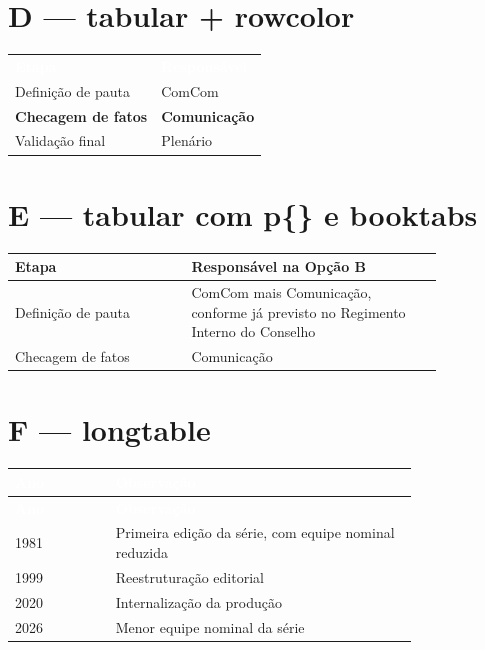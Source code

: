 \documentclass[11pt]{article}
\begin{document}
\section*{D --- tabular + rowcolor}

\begin{tabular}{ll}
  \rowcolor{herhighness}
  \textcolor{white}{\textbf{Etapa}} & \textcolor{white}{\textbf{Responsável}} \\
  Definição de pauta & ComCom \\
  \rowcolor{alarmefundo}
  \textbf{Checagem de fatos} & \textbf{Comunicação} \\
  Validação final & Plenário \\
\end{tabular}

\section*{E --- tabular com p\{\} e booktabs}

\begin{tabular}{p{0.35\linewidth}p{0.5\linewidth}}
  \toprule
  \textbf{Etapa} & \textbf{Responsável na Opção B} \\
  \midrule
  Definição de pauta & ComCom mais Comunicação, conforme já previsto
  no Regimento Interno do Conselho \\
  Checagem de fatos & Comunicação \\
  \bottomrule
\end{tabular}

\section*{F --- longtable}

\begin{longtable}{p{0.2\linewidth}p{0.6\linewidth}}
  \rowcolor{herhighness}
  \textcolor{white}{\textbf{Ano}} & \textcolor{white}{\textbf{Observação}} \\
  \endfirsthead
  \rowcolor{herhighness}
  \textcolor{white}{\textbf{Ano}} & \textcolor{white}{\textbf{Observação}} \\
  \endhead
  1981 & Primeira edição da série, com equipe nominal reduzida \\
  1999 & Reestruturação editorial \\
  2020 & Internalização da produção \\
  2026 & Menor equipe nominal da série \\
\end{longtable}
\end{document}
